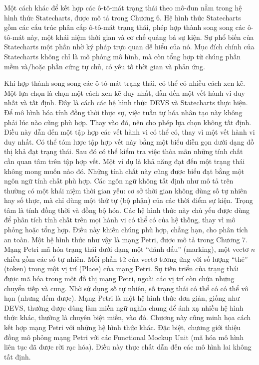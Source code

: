 Một cách khác để kết hợp các ô-tô-mát trạng thái theo mô-đun nằm trong hệ hình thức Statecharts, được mô tả trong Chương 6. Hệ hình thức Statecharts gồm các cấu trúc phân cấp ô-tô-mát trạng thái, phép hợp thành song song các ô-tô-mát này, một khái niệm thời gian và cơ chế quảng bá sự kiện. Sự phổ biến của Statecharts một phần nhờ ký pháp trực quan dễ hiểu của nó. Mục đích chính của Statecharts không chỉ là mô phỏng mô hình, mà còn tổng hợp từ chúng phần mềm và/hoặc phần cứng tự chủ, có yếu tố thời gian và phản ứng.

Khi hợp thành song song các ô-tô-mát trạng thái, có thể có nhiều cách xen kẽ. Một lựa chọn là chọn một cách xen kẽ duy nhất, dẫn đến một vết hành vi duy nhất và tất định. Đây là cách các hệ hình thức DEVS và Statecharts thực hiện. Để mô hình hóa tính đồng thời thực sự, việc tuần tự hóa nhân tạo này không phải lúc nào cũng phù hợp. Thay vào đó, nên cho phép lựa chọn không tất định. Điều này dẫn đến một tập hợp các vết hành vi có thể có, thay vì một vết hành vi duy nhất. Có thể tóm lược tập hợp vết này bằng một biểu diễn gọn dưới dạng đồ thị khả đạt trạng thái. Sau đó có thể kiểm tra việc thỏa mãn những tính chất cần quan tâm trên tập hợp vết. Một ví dụ là khả năng đạt đến một trạng thái không mong muốn nào đó. Những tính chất này cũng được biểu đạt bằng một ngôn ngữ tính chất phù hợp. Các ngôn ngữ không tất định như mô tả trên thường có một khái niệm thời gian yếu: cơ sở thời gian không dùng số tự nhiên hay số thực, mà chỉ dùng một thứ tự (bộ phận) của các thời điểm sự kiện. Trọng tâm là tính đồng thời và đồng bộ hóa. Các hệ hình thức này chủ yếu được dùng để phân tích tính chất trên mọi hành vi có thể có của hệ thống, thay vì mô phỏng hoặc tổng hợp. Điều này khiến chúng phù hợp, chẳng hạn, cho phân tích an toàn. Một hệ hình thức như vậy là mạng Petri, được mô tả trong Chương 7. Mạng Petri mã hóa trạng thái dưới dạng một ``đánh dấu'' (marking), một vectơ $n$ chiều gồm các số tự nhiên. Mỗi phần tử của vectơ tương ứng với số lượng ``thẻ'' (token) trong một vị trí (Place) của mạng Petri. Sự tiến triển của trạng thái được mã hóa trong một đồ thị mạng Petri, ngoài các vị trí còn chứa những chuyển tiếp và cung. Nhờ sử dụng số tự nhiên, số trạng thái có thể có có thể vô hạn (nhưng đếm được). Mạng Petri là một hệ hình thức đơn giản, giống như DEVS, thường được dùng làm miền ngữ nghĩa chung để ánh xạ nhiều hệ hình thức khác,
thường là chuyên biệt miền, vào đó. Chương này cũng minh họa cách kết hợp mạng Petri với những hệ hình thức khác. Đặc biệt, chương giới thiệu đồng mô phỏng mạng Petri với các Functional Mockup Unit (mã hóa mô hình liên tục đã được rời rạc hóa). Điều này thực chất dẫn đến các mô hình lai không tất định.

